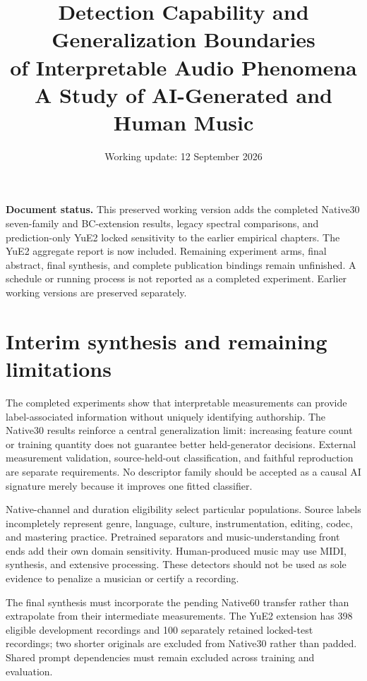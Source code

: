 \documentclass[11pt,a4paper]{article}
\title{Detection Capability and Generalization Boundaries\\of Interpretable Audio Phenomena\\
\large A Study of AI-Generated and Human Music}
\author{}
\date{Working update: 12 September 2026}
\begin{document}
\maketitle
\noindent\textbf{Document status.} This preserved working version adds the completed
Native30 seven-family and BC-extension results, legacy spectral comparisons,
and prediction-only YuE2 locked sensitivity to the earlier empirical chapters.
The YuE2 aggregate report is now included. Remaining
experiment arms, final abstract, final synthesis, and complete publication bindings
remain unfinished. A schedule or running process is not reported as a completed
experiment. Earlier working versions are preserved separately.
\tableofcontents
\clearpage














\section{Interim synthesis and remaining limitations}
The completed experiments show that interpretable measurements can provide
label-associated information without uniquely identifying authorship. The
Native30 results reinforce a central generalization limit: increasing feature
count or training quantity does not guarantee better held-generator decisions.
External measurement validation, source-held-out classification, and faithful
reproduction are separate requirements. No descriptor family should be accepted
as a causal AI signature merely because it improves one fitted classifier.

Native-channel and duration eligibility select particular populations. Source
labels incompletely represent genre, language, culture, instrumentation, editing,
codec, and mastering practice. Pretrained separators and music-understanding
front ends add their own domain sensitivity. Human-produced music may use MIDI,
synthesis, and extensive processing. These detectors should not be used as sole
evidence to penalize a musician or certify a recording.

The final synthesis must incorporate the pending Native60 transfer rather
than extrapolate from their intermediate measurements. The YuE2 extension has
398 eligible development recordings and 100 separately retained locked-test
recordings; two shorter originals are excluded from Native30 rather than padded.
Shared prompt dependencies must remain excluded across training and evaluation.



\end{document}
